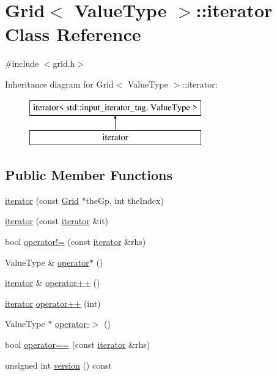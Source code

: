 \hypertarget{classGrid_1_1iterator}{}\section{Grid$<$ Value\+Type $>$\+:\+:iterator Class Reference}
\label{classGrid_1_1iterator}


{\ttfamily \#include $<$grid.\+h$>$}

Inheritance diagram for Grid$<$ Value\+Type $>$\+:\+:iterator\+:\begin{figure}[H]
\begin{center}
\leavevmode
\includegraphics[height=2.000000cm]{classGrid_1_1iterator}
\end{center}
\end{figure}
\subsection*{Public Member Functions}
\begin{DoxyCompactItemize}
\item 
\mbox{\hyperlink{classGrid_1_1iterator_a24675920b744cc15e50807e857fa88cb}{iterator}} (const \mbox{\hyperlink{classGrid}{Grid}} $\ast$the\+Gp, int the\+Index)
\item 
\mbox{\hyperlink{classGrid_1_1iterator_a698b7553261e7209d6c29fb55627dce4}{iterator}} (const \mbox{\hyperlink{classGrid_1_1iterator}{iterator}} \&it)
\item 
bool \mbox{\hyperlink{classGrid_1_1iterator_ae1983f2cb0df1f0cbe77ac29590e2e2b}{operator!=}} (const \mbox{\hyperlink{classGrid_1_1iterator}{iterator}} \&rhs)
\item 
Value\+Type \& \mbox{\hyperlink{classGrid_1_1iterator_ae7b3826e734ec2f7c79f5196fad83989}{operator$\ast$}} ()
\item 
\mbox{\hyperlink{classGrid_1_1iterator}{iterator}} \& \mbox{\hyperlink{classGrid_1_1iterator_af1b1c7856a59f34c7d3570f946a2ff00}{operator++}} ()
\item 
\mbox{\hyperlink{classGrid_1_1iterator}{iterator}} \mbox{\hyperlink{classGrid_1_1iterator_a538d230f8b52d2bc0950e26ce74ec239}{operator++}} (int)
\item 
Value\+Type $\ast$ \mbox{\hyperlink{classGrid_1_1iterator_a5ba42337ec7bae549bb135838933b0ea}{operator-\/$>$}} ()
\item 
bool \mbox{\hyperlink{classGrid_1_1iterator_a798956e7a65ef16c891d129b3ced0f9e}{operator==}} (const \mbox{\hyperlink{classGrid_1_1iterator}{iterator}} \&rhs)
\item 
unsigned int \mbox{\hyperlink{classGrid_1_1iterator_a0aa696ccb72cbf928535d6b646bac1aa}{version}} () const
\end{DoxyCompactItemize}


